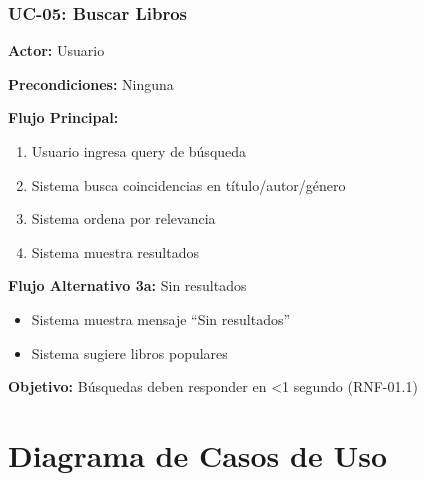 \documentclass[aspectratio=169]{beamer}
\begin{document}
\begin{frame}
\frametitle{UC-05: Buscar Libros}

\textbf{Actor:} Usuario

\textbf{Precondiciones:} Ninguna

\textbf{Flujo Principal:}
\begin{enumerate}
\item Usuario ingresa query de búsqueda
\item Sistema busca coincidencias en título/autor/género
\item Sistema ordena por relevancia
\item Sistema muestra resultados
\end{enumerate}

\textbf{Flujo Alternativo 3a:} Sin resultados
\begin{itemize}
\item Sistema muestra mensaje ``Sin resultados''
\item Sistema sugiere libros populares
\end{itemize}

\vspace{0.3cm}

\begin{tcolorbox}[colback=blue!5, colframe=blue!50]
\textbf{Objetivo:} Búsquedas deben responder en <1 segundo (RNF-01.1)
\end{tcolorbox}

\end{frame}

\section{Diagrama de Casos de Uso}
\end{document}
